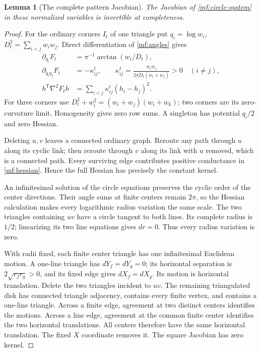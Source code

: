 \documentclass[11pt]{article}
\numberwithin{equation}{section}
\newtheorem{lemma}[theorem]{Lemma}
\theoremstyle{definition}
\theoremstyle{remark}
\begin{document}
\begin{lemma}[The complete pattern Jacobian]\label{mf:pattern-rank}
The Jacobian of \eqref{mf:circle-system} in these normalized variables
is invertible at completeness.
\end{lemma}
\begin{proof}
For the ordinary corners \(I_t\) of one triangle put
\(q_i=\log w_i\), \(D_t^2=\sum_{i<j}w_iw_j\).
Direct differentiation of \eqref{mf:angles} gives
\begin{equation}\label{mf:hessian}
\begin{aligned}
 \partial_{q_i}F_t&=\pi^{-1}\arctan(w_i/D_t),\\
 \partial_{q_iq_j}F_t&=-\kappa^t_{ij},\qquad
 \kappa^t_{ij}=\frac{w_iw_j}{2\pi D_t(w_i+w_j)}>0\quad(i\ne j),\\
 h^{\mathsf T}\nabla^2F_t h
      &=\sum_{i<j}\kappa^t_{ij}(h_i-h_j)^2 .
\end{aligned}
\end{equation}
For three corners use
\(D_t^2+w_i^2=(w_i+w_j)(w_i+w_k)\); two corners are its
zero-curvature limit. Homogeneity gives zero row sums. A singleton
has potential \(q_i/2\) and zero Hessian.

Deleting \(u,v\) leaves a connected ordinary graph. Reroute any path
through \(u\) along its cyclic link; then reroute through \(v\)
along its link with \(u\) removed, which is a connected path.
Every surviving edge contributes positive conductance in
\eqref{mf:hessian}. Hence the full Hessian has precisely the
constant kernel.

An infinitesimal solution of the circle equations preserves the
cyclic order of the center directions. Their angle sums at finite centers remain
\(2\pi\), so the Hessian calculation makes every logarithmic radius
variation the same scale. The two triangles containing \(uv\)
have a circle tangent to both lines. Its complete radius is \(1/2\);
linearizing its two line equations gives \(dr=0\).
Thus every radius variation is zero.

With radii fixed, each finite center triangle has one infinitesimal
Euclidean motion. A one-line triangle has \(dY_f=dY_g=0\);
its horizontal separation is \(2\sqrt{r_fr_g}>0\), and its fixed
edge gives \(dX_f=dX_g\). Its motion is horizontal translation.
Delete the two triangles incident to \(uv\). The remaining
triangulated disk has connected triangle adjacency, contains every
finite vertex, and contains a one-line triangle. Across a finite
edge, agreement at two distinct centers identifies the motions.
Across a line edge, agreement at the common finite center identifies
the two horizontal translations. All centers therefore have the same
horizontal translation. The fixed \(X\) coordinate removes it.
The square Jacobian has zero kernel.
\end{proof}
\end{document}
